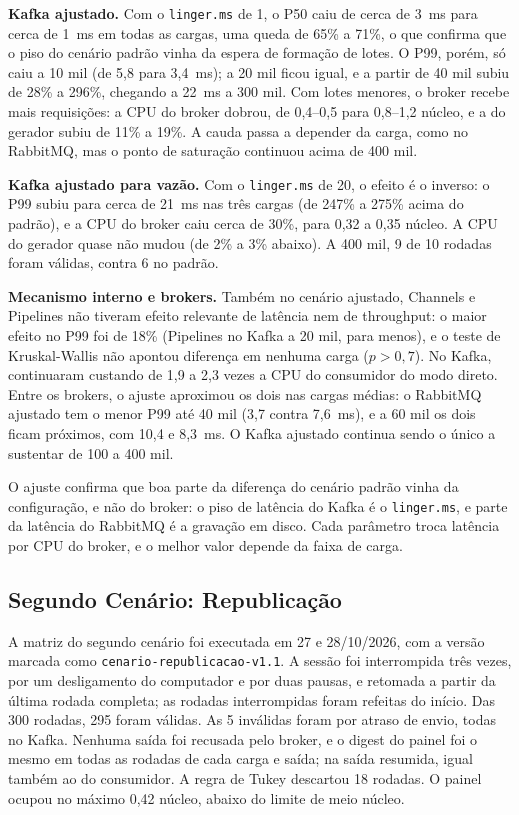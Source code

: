 \documentclass[12pt]{article}
\begin{document}
\textbf{Kafka ajustado.} Com o \texttt{linger.ms} de 1, o P50 caiu de cerca de 3~ms para
cerca de 1~ms em todas as cargas, uma queda de 65\% a 71\%, o que confirma que o piso do
cenário padrão vinha da espera de formação de lotes. O P99, porém, só caiu a 10 mil
(de 5,8 para 3,4~ms); a 20 mil ficou igual, e a partir de 40 mil subiu de 28\% a
296\%, chegando a 22~ms a 300 mil. Com lotes menores, o broker recebe mais requisições:
a CPU do broker dobrou, de 0,4--0,5 para 0,8--1,2 núcleo, e a do gerador subiu de 11\% a
19\%. A cauda passa a depender da carga, como no RabbitMQ, mas o ponto de saturação
continuou acima de 400 mil.

\textbf{Kafka ajustado para vazão.} Com o \texttt{linger.ms} de 20, o efeito é o
inverso: o P99 subiu para cerca de 21~ms nas três cargas (de 247\% a 275\% acima do
padrão), e a CPU do broker caiu cerca de 30\%, para 0,32 a 0,35 núcleo. A CPU do gerador
quase não mudou (de 2\% a 3\% abaixo). A 400 mil, 9 de 10 rodadas foram válidas, contra
6 no padrão.

\textbf{Mecanismo interno e brokers.} Também no cenário ajustado, Channels e Pipelines
não tiveram efeito relevante de latência nem de throughput: o maior efeito no P99 foi de
18\% (Pipelines no Kafka a 20 mil, para menos), e o teste de Kruskal-Wallis não apontou
diferença em nenhuma carga ($p > 0{,}7$). No Kafka, continuaram custando de 1,9 a 2,3
vezes a CPU do consumidor do modo direto. Entre os brokers, o ajuste aproximou os dois
nas cargas médias: o RabbitMQ ajustado tem o menor P99 até 40 mil (3,7 contra 7,6~ms), e
a 60 mil os dois ficam próximos, com 10,4 e 8,3~ms. O Kafka ajustado continua sendo o único a
sustentar de 100 a 400 mil.

O ajuste confirma que boa parte da diferença do cenário padrão vinha da configuração,
e não do broker: o piso de latência do Kafka é o \texttt{linger.ms}, e parte da latência
do RabbitMQ é a gravação em disco. Cada parâmetro troca latência por CPU do broker, e o
melhor valor depende da faixa de carga.

\subsection{Segundo Cenário: Republicação}
\label{sec:res-republicacao}

A matriz do segundo cenário foi executada em 27 e 28/10/2026, com a versão marcada como
\texttt{cenario-republicacao-v1.1}. A sessão foi interrompida três vezes, por um
desligamento do computador e por duas pausas, e retomada a partir da última rodada
completa; as rodadas interrompidas foram refeitas do início. Das 300 rodadas, 295 foram
válidas. As 5 inválidas foram por atraso de envio, todas no Kafka. Nenhuma saída foi
recusada pelo broker, e o digest do painel foi o mesmo em todas as rodadas de cada carga
e saída; na saída resumida, igual também ao do consumidor. A regra de Tukey descartou 18
rodadas. O painel ocupou no máximo 0,42 núcleo, abaixo do limite de meio núcleo.
\end{document}
